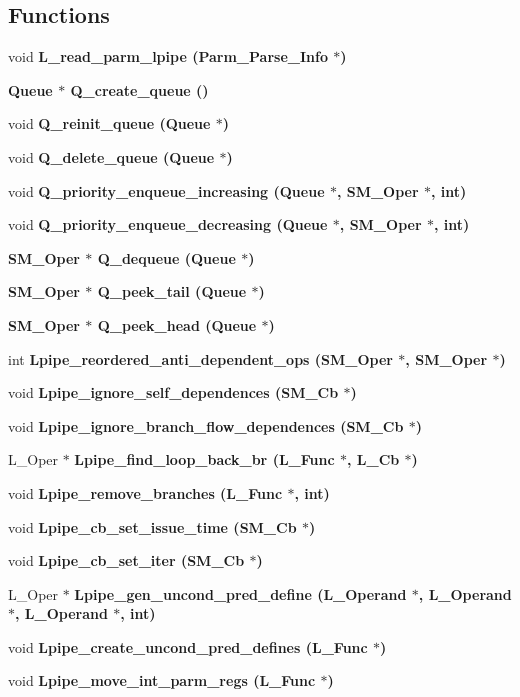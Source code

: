 \subsection*{Functions}
\begin{CompactItemize}
\item 
void \bf{L\_\-read\_\-parm\_\-lpipe} (Parm\_\-Parse\_\-Info $\ast$)
\item 
\bf{Queue} $\ast$ \bf{Q\_\-create\_\-queue} ()
\item 
void \bf{Q\_\-reinit\_\-queue} (\bf{Queue} $\ast$)
\item 
void \bf{Q\_\-delete\_\-queue} (\bf{Queue} $\ast$)
\item 
void \bf{Q\_\-priority\_\-enqueue\_\-increasing} (\bf{Queue} $\ast$, \bf{SM\_\-Oper} $\ast$, int)
\item 
void \bf{Q\_\-priority\_\-enqueue\_\-decreasing} (\bf{Queue} $\ast$, \bf{SM\_\-Oper} $\ast$, int)
\item 
\bf{SM\_\-Oper} $\ast$ \bf{Q\_\-dequeue} (\bf{Queue} $\ast$)
\item 
\bf{SM\_\-Oper} $\ast$ \bf{Q\_\-peek\_\-tail} (\bf{Queue} $\ast$)
\item 
\bf{SM\_\-Oper} $\ast$ \bf{Q\_\-peek\_\-head} (\bf{Queue} $\ast$)
\item 
int \bf{Lpipe\_\-reordered\_\-anti\_\-dependent\_\-ops} (\bf{SM\_\-Oper} $\ast$, \bf{SM\_\-Oper} $\ast$)
\item 
void \bf{Lpipe\_\-ignore\_\-self\_\-dependences} (\bf{SM\_\-Cb} $\ast$)
\item 
void \bf{Lpipe\_\-ignore\_\-branch\_\-flow\_\-dependences} (\bf{SM\_\-Cb} $\ast$)
\item 
L\_\-Oper $\ast$ \bf{Lpipe\_\-find\_\-loop\_\-back\_\-br} (L\_\-Func $\ast$, L\_\-Cb $\ast$)
\item 
void \bf{Lpipe\_\-remove\_\-branches} (L\_\-Func $\ast$, int)
\item 
void \bf{Lpipe\_\-cb\_\-set\_\-issue\_\-time} (\bf{SM\_\-Cb} $\ast$)
\item 
void \bf{Lpipe\_\-cb\_\-set\_\-iter} (\bf{SM\_\-Cb} $\ast$)
\item 
L\_\-Oper $\ast$ \bf{Lpipe\_\-gen\_\-uncond\_\-pred\_\-define} (L\_\-Operand $\ast$, L\_\-Operand $\ast$, L\_\-Operand $\ast$, int)
\item 
void \bf{Lpipe\_\-create\_\-uncond\_\-pred\_\-defines} (L\_\-Func $\ast$)
\item 
void \bf{Lpipe\_\-move\_\-int\_\-parm\_\-regs} (L\_\-Func $\ast$)
\item 

\end{CompactItemize}
